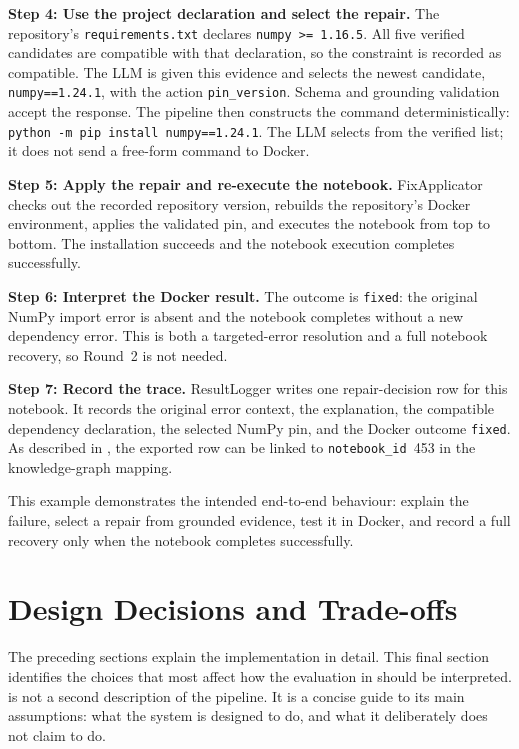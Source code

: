 \medskip
\noindent\textbf{Step 4: Use the project declaration and select the repair.}
The repository's \texttt{requirements.txt} declares
\texttt{numpy >= 1.16.5}. All five verified candidates are compatible with
that declaration, so the constraint is recorded as compatible. The LLM is
given this evidence and selects the newest candidate, \texttt{numpy==1.24.1},
with the action \texttt{pin\_version}. Schema and grounding validation accept
the response. The pipeline then constructs the command deterministically:
\texttt{python -m pip install numpy==1.24.1}. The LLM selects from the
verified list; it does not send a free-form command to Docker.

\medskip
\noindent\textbf{Step 5: Apply the repair and re-execute the notebook.}
FixApplicator checks out the recorded repository version, rebuilds the
repository's Docker environment, applies the validated pin, and executes the
notebook from top to bottom. The installation succeeds and the notebook
execution completes successfully.

\medskip
\noindent\textbf{Step 6: Interpret the Docker result.}
The outcome is \texttt{fixed}: the original NumPy import error is absent and
the notebook completes without a new dependency error. This is both a
targeted-error resolution and a full notebook recovery, so Round~2 is not
needed.

\medskip
\noindent\textbf{Step 7: Record the trace.}
ResultLogger writes one repair-decision row for this notebook. It records the
original error context, the explanation, the compatible dependency
declaration, the selected NumPy pin, and the Docker outcome
\texttt{fixed}. As described in , the exported row
can be linked to \texttt{notebook\_id}~453 in the knowledge-graph mapping.

This example demonstrates the intended end-to-end behaviour: explain the
failure, select a repair from grounded evidence, test it in Docker, and
record a full recovery only when the notebook completes successfully.

\section{Design Decisions and Trade-offs}
\label{sec:m-decisions}

The preceding sections explain the implementation in detail. This final
section identifies the choices that most affect how the evaluation in
 should be interpreted.  is not
a second description of the pipeline. It is a concise guide to its main
assumptions: what the system is designed to do, and what it deliberately
does not claim to do.

